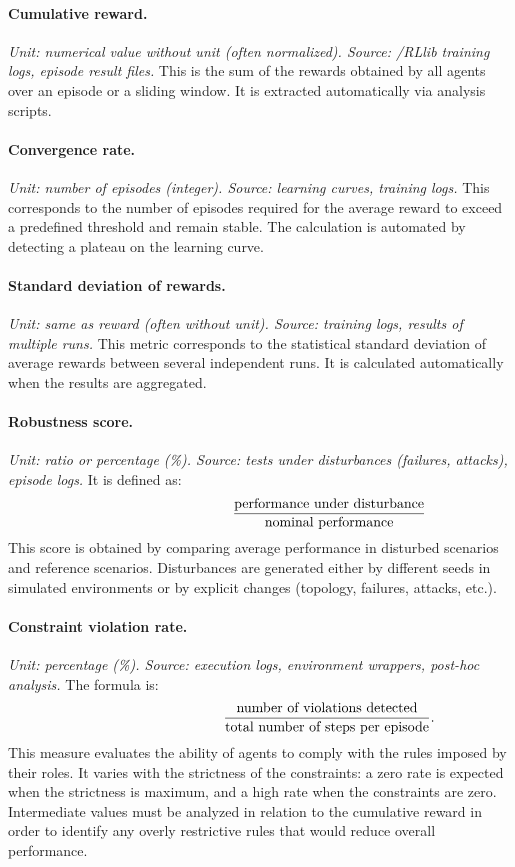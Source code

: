 \paragraph{Cumulative reward.}
\textit{Unit: numerical value without unit (often normalized). Source: /RLlib training logs, episode result files.}
This is the sum of the rewards obtained by all agents over an episode or a sliding window.
It is extracted automatically via analysis scripts.

\paragraph{Convergence rate.}
\textit{Unit: number of episodes (integer). Source: learning curves, training logs. }
This corresponds to the number of episodes required for the average reward to exceed a predefined threshold and remain stable.
The calculation is automated by detecting a plateau on the learning curve.

\paragraph{Standard deviation of rewards.}
\textit{Unit: same as reward (often without unit). Source: training logs, results of multiple runs.}
This metric corresponds to the statistical standard deviation of average rewards between several independent runs.
It is calculated automatically when the results are aggregated.

\paragraph{Robustness score.}
\textit{Unit: ratio or percentage (\%). Source: tests under disturbances (failures, attacks), episode logs.}
It is defined as:
\[
  \hspace{3.5cm}\frac{\text{performance under disturbance}}{\text{nominal performance}}
\]
This score is obtained by comparing average performance in disturbed scenarios and reference scenarios.
Disturbances are generated either by different seeds in simulated environments or by explicit changes (topology, failures, attacks, etc.).

\paragraph{Constraint violation rate.}
\textit{Unit: percentage (\%). Source: execution logs, environment wrappers, post-hoc analysis.}
The formula is:
\[
  \hspace{3.5cm}\frac{\text{number of violations detected}}{\text{total number of steps per episode}}.
\]
This measure evaluates the ability of agents to comply with the rules imposed by their roles.
It varies with the strictness of the constraints: a zero rate is expected when the strictness is maximum, and a high rate when the constraints are zero.
Intermediate values must be analyzed in relation to the cumulative reward in order to identify any overly restrictive rules that would reduce overall performance.

